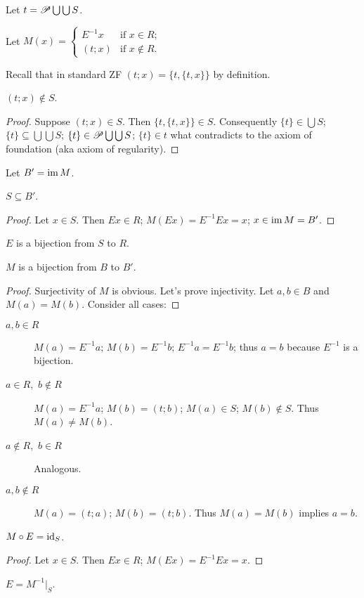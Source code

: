 Let $t=\mathscr{P}\bigcup\bigcup S$.

Let $M(x)=\left\{ \begin{array}{ll}
E^{-1}x & \text{if }x\in R;\\
(t;x) & \text{if }x\notin R.
\end{array}\right.$

Recall that in standard ZF $(t;x)=\{t,\{t,x\}\}$ by definition.
\begin{thm}
$(t;x)\notin S$.\end{thm}
\begin{proof}
Suppose $(t;x)\in S$. Then $\{t,\{t,x\}\}\in S$. Consequently $\{t\}\in\bigcup S$;
$\{t\}\subseteq\bigcup\bigcup S$; $\{t\}\in\mathscr{P}\bigcup\bigcup S$;
$\{t\}\in t$ what contradicts to the axiom of foundation (aka axiom
of regularity).\end{proof}
\begin{defn}
Let $B'=\operatorname{im} M$.\end{defn}
\begin{thm}
$S\subseteq B'$.\end{thm}
\begin{proof}
Let $x\in S$. Then $Ex\in R$; $M(Ex)=E^{-1}Ex=x$; $x\in\operatorname{im} M=B'$.\end{proof}
\begin{obvious}
$E$ is a bijection from $S$ to $R$.\end{obvious}
\begin{thm}
$M$ is a bijection from $B$ to $B'$.\end{thm}
\begin{proof}
Surjectivity of $M$ is obvious. Let's prove injectivity. Let $a,b\in B$
and $M(a)=M(b)$. Consider all cases: \end{proof}
\begin{description}
\item [{$a,b\in R$}] $M(a)=E^{-1}a$; $M(b)=E^{-1}b$; $E^{-1}a=E^{-1}b$;
thus $a=b$ because $E^{-1}$ is a bijection.
\item [{$a\in R$,~$b\notin R$}] $M(a)=E^{-1}a$; $M(b)=(t;b)$; $M(a)\in S$;
$M(b)\notin S$. Thus $M(a)\neq M(b)$.
\item [{$a\notin R$,~$b\in R$}] Analogous.
\item [{$a,b\notin R$}] $M(a)=(t;a)$; $M(b)=(t;b)$. Thus $M(a)=M(b)$
implies $a=b$. \end{description}
\begin{thm}
$M\circ E=\operatorname{id}_{S}$.\end{thm}
\begin{proof}
Let $x\in S$. Then $Ex\in R$; $M(Ex)=E^{-1}Ex=x$.\end{proof}
\begin{obvious}
$E=M^{-1}|_{S}$.
\end{obvious}

